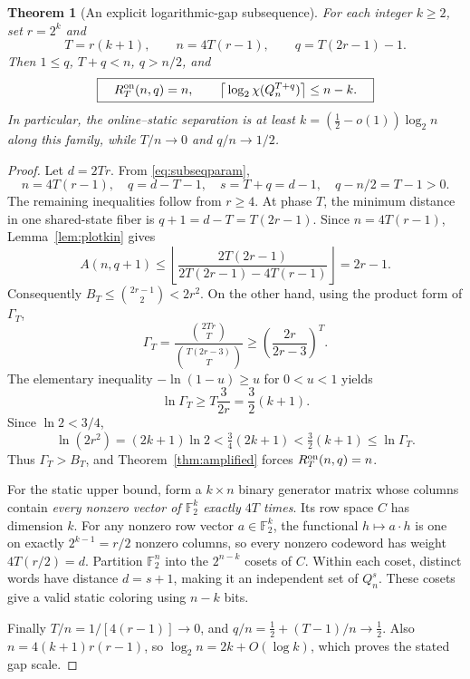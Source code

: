 \documentclass[11pt,a4paper]{article}
\newtheorem{theorem}{Theorem}[section]
\begin{document}
\begin{theorem}[An explicit logarithmic-gap subsequence]\label{thm:subseq}
For each integer $k\ge2$, set $r=2^k$ and
\begin{equation}\label{eq:subseqparam}
 T=r(k+1),\qquad n=4T(r-1),\qquad q=T(2r-1)-1.
\end{equation}
Then $1\le q$, $T+q<n$, $q>n/2$, and
\begin{equation}\label{eq:subseqresult}
 \boxed{\quad R_T^{\rm on}(n,q)=n,\qquad
 \big\lceil\log_2\chi(Q_n^{T+q})\big\rceil\le n-k.\quad}
\end{equation}
In particular, the online--static separation is at least $k=\left(\tfrac12-o(1)\right)\log_2 n$ along this family, while $T/n\to0$ and $q/n\to1/2$.
\end{theorem}
\begin{proof}
Let $d=2Tr$. From \eqref{eq:subseqparam},
\[
 n=4T(r-1),\quad q=d-T-1,\quad s=T+q=d-1,
 \quad q-n/2=T-1>0.
\]
The remaining inequalities follow from $r\ge4$. At phase $T$, the minimum distance in one shared-state fiber is $q+1=d-T=T(2r-1)$. Since $n=4T(r-1)$, Lemma~\ref{lem:plotkin} gives
\[
 A(n,q+1)\le\left\lfloor
 \frac{2T(2r-1)}{2T(2r-1)-4T(r-1)}\right\rfloor
 =2r-1.
\]
Consequently $B_T\le\binom{2r-1}2<2r^2$. On the other hand, using the product form of $\Gamma_T$,
\[
 \Gamma_T=\frac{\binom{2Tr}T}{\binom{T(2r-3)}T}
 \ge\left(\frac{2r}{2r-3}\right)^T.
\]
The elementary inequality $-\ln(1-u)\ge u$ for $0<u<1$ yields
\[
 \ln\Gamma_T\ge T\frac{3}{2r}=\frac32(k+1).
\]
Since $\ln2<3/4$,
\[
 \ln(2r^2)=(2k+1)\ln2<\tfrac34(2k+1)
 <\tfrac32(k+1)\le\ln\Gamma_T.
\]
Thus $\Gamma_T>B_T$, and Theorem~\ref{thm:amplified} forces $R_T^{\rm on}(n,q)=n$.

For the static upper bound, form a $k\times n$ binary generator matrix whose columns contain \emph{every nonzero vector of $\mathbb F_2^k$ exactly $4T$ times}. Its row space $C$ has dimension $k$. For any nonzero row vector $a\in\mathbb F_2^k$, the functional $h\mapsto a\cdot h$ is one on exactly $2^{k-1}=r/2$ nonzero columns, so every nonzero codeword has weight $4T(r/2)=d$. Partition $\mathbb F_2^n$ into the $2^{n-k}$ cosets of $C$. Within each coset, distinct words have distance $d=s+1$, making it an independent set of $Q_n^s$. These cosets give a valid static coloring using $n-k$ bits.

Finally $T/n=1/[4(r-1)]\to0$, and $q/n=\frac12+(T-1)/n\to\frac12$. Also $n=4(k+1)r(r-1)$, so $\log_2 n=2k+O(\log k)$, which proves the stated gap scale.
\end{proof}
\end{document}
